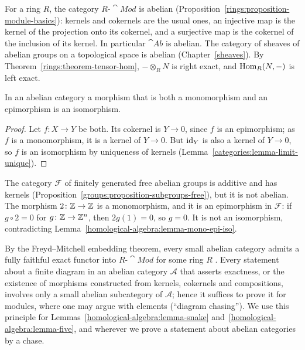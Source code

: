 \begin{example}\label{homological-algebra:example-abelian}
For a ring $R$, the category $R\text{-}\cat{Mod}$ is abelian (Proposition~\ref{rings:proposition-module-basics}):
kernels and cokernels are the usual ones, an injective map is the kernel of the projection onto its cokernel, and a
surjective map is the cokernel of the inclusion of its kernel. In particular $\cat{Ab}$ is abelian. The category of
sheaves of abelian groups on a topological space is abelian (Chapter~\ref{sheaves}). By
Theorem~\ref{rings:theorem-tensor-hom}, $- \otimes_R N$ is right exact, and $\operatorname{Hom}_R(N, -)$ is left exact.
\end{example}

\begin{lemma}\label{homological-algebra:lemma-mono-epi-iso}
In an abelian category a morphism that is both a monomorphism and an epimorphism is an isomorphism.
\end{lemma}

\begin{proof}
Let $f \colon X \to Y$ be both. Its cokernel is $Y \to 0$, since $f$ is an epimorphism; as $f$ is a monomorphism, it is a
kernel of $Y \to 0$. But $\mathrm{id}_Y$ is also a kernel of $Y \to 0$, so $f$ is an isomorphism by uniqueness of kernels
(Lemma~\ref{categories:lemma-limit-unique}).
\end{proof}

\begin{counterexample}\label{homological-algebra:counterexample-not-abelian}
The category $\mathcal{F}$ of finitely generated free abelian groups is additive and has kernels
(Proposition~\ref{groups:proposition-subgroups-free}), but it is not abelian. The morphism $2 \colon \mathbb{Z} \to \mathbb{Z}$ is a
monomorphism, and it is an epimorphism in $\mathcal{F}$: if $g \circ 2 = 0$ for $g \colon \mathbb{Z} \to \mathbb{Z}^n$, then $2g(1) = 0$, so
$g = 0$. It is not an isomorphism, contradicting Lemma~\ref{homological-algebra:lemma-mono-epi-iso}.
\end{counterexample}

\begin{remark}\label{homological-algebra:remark-freyd-mitchell}
By the Freyd--Mitchell embedding theorem, every small abelian category admits a fully faithful exact functor into
$R\text{-}\cat{Mod}$ for some ring $R$ \cite[Theorem 1.6.1]{weibel-homological}. Every statement about a finite diagram
in an abelian category $\mathcal{A}$ that asserts exactness, or the existence of morphisms constructed from kernels,
cokernels and compositions, involves only a small abelian subcategory of $\mathcal{A}$; hence it suffices to prove it for
modules, where one may argue with elements (``diagram chasing''). We use this principle for
Lemmas~\ref{homological-algebra:lemma-snake} and~\ref{homological-algebra:lemma-five}, and wherever we prove a
statement about abelian categories by a chase.
\end{remark}

